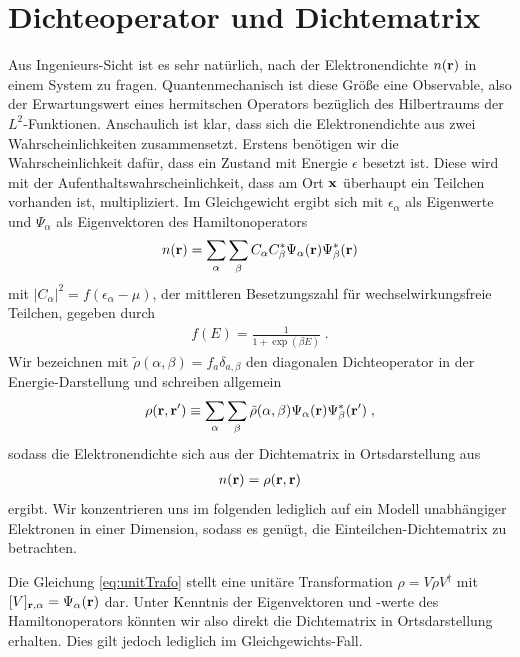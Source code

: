 \section{Dichteoperator und Dichtematrix}
Aus Ingenieurs-Sicht ist es sehr natürlich, nach der Elektronendichte $n(\vb{r})$ in einem System zu fragen. Quantenmechanisch ist diese Größe eine Observable, also der Erwartungswert eines hermitschen Operators bezüglich des Hilbertraums der $L^2$-Funktionen. Anschaulich ist klar, dass sich die Elektronendichte aus zwei Wahrscheinlichkeiten zusammensetzt. Erstens benötigen wir die Wahrscheinlichkeit dafür, dass ein Zustand mit Energie $\epsilon$ besetzt ist. Diese wird mit der  Aufenthaltswahrscheinlichkeit, dass am Ort $\vb{x}$ überhaupt ein Teilchen vorhanden ist, multipliziert. Im Gleichgewicht ergibt sich mit $\epsilon_{\alpha}$ als Eigenwerte und $\Psi_{\alpha}$ als Eigenvektoren des Hamiltonoperators \cite{datta}
\begin{align}
  n(\vb{r}) = \sum_{\alpha} \sum_{\beta} C_{\alpha} C_{\beta}^*\Psi_{\alpha}(\vb{r}) \Psi_{\beta}^*(\vb{r})
\end{align}
mit $|C_{\alpha}|^2 = f(\epsilon_{\alpha}-\mu)$, der mittleren Besetzungszahl für wechselwirkungsfreie Teilchen, gegeben durch
\begin{align}
  f(E) = \frac{1}{1+\exp(\beta E)} \; .
\end{align}
Wir bezeichnen mit $\tilde{\rho}(\alpha,\beta) = f_a\delta_{a,\beta}$ den diagonalen Dichteoperator in der Energie-Darstellung und schreiben allgemein
\begin{align}
  \rho(\vb{r},\vb{r}') \equiv \sum_{\alpha} \sum_{\beta} \tilde{\rho}(\alpha,\beta)\Psi_{\alpha}(\vb{r})\Psi^*_{\beta}(\vb{r}') \; ,
  \label{eq:unitTrafo}
\end{align}
sodass die Elektronendichte sich aus der Dichtematrix in Ortsdarstellung aus
\begin{align}
  n(\vb{r}) = \rho(\vb{r},\vb{r})
\end{align}
ergibt.
Wir konzentrieren uns im folgenden lediglich auf ein Modell unabhängiger Elektronen in einer Dimension, sodass es genügt, die Einteilchen-Dichtematrix zu betrachten.

Die Gleichung \eqref{eq:unitTrafo} stellt eine unitäre Transformation $\rho = V\tilde{\rho}V^{\dagger}$ mit $[V]_{\vb{r},\alpha} = \Psi_{\alpha}(\vb{r})$ dar. Unter Kenntnis der Eigenvektoren und -werte des Hamiltonoperators könnten wir also direkt die Dichtematrix in Ortsdarstellung erhalten. Dies gilt jedoch lediglich im Gleichgewichts-Fall.

